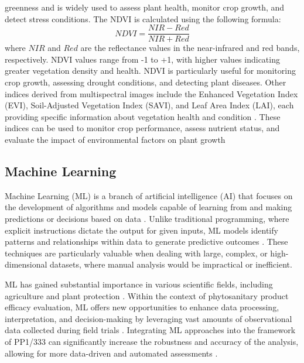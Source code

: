 \documentclass[12pt,a4paper,oneside]{report}
\begin{document}
greenness and is widely used to assess plant health, monitor crop growth, and
detect stress conditions. The NDVI is calculated using the following formula:
\[
NDVI = \frac{NIR - Red}{NIR + Red}
\]
where \(NIR\) and \(Red\) are the reflectance values in the near-infrared and red
bands, respectively. NDVI values range from -1 to +1, with higher values indicating
greater vegetation density and health. NDVI is particularly useful for monitoring
crop growth, assessing drought conditions, and detecting plant diseases.
Other indices derived from multispectral images include the Enhanced
Vegetation Index (EVI), Soil-Adjusted Vegetation Index (SAVI), and Leaf Area
Index (LAI), each providing specific information about vegetation health and
condition
\cite{hueteOverviewRadiometricBiophysical2002,qiModifiedSoilAdjusted1994}. 
These indices can be used to monitor crop performance, assess
nutrient status, and evaluate the impact of environmental factors on plant
growth
\cite{jonesRemoteSensingVegetation2010,mahleinHyperspectralSensorsImaging2018}

\subsection{Machine Learning}

Machine Learning (ML) is a branch of artificial intelligence (AI) that 
focuses on the development of algorithms and models capable of learning 
from and making predictions or decisions based on data \cite{kozaAutomatedDesignBoth1996}. 
Unlike traditional 
programming, where explicit instructions dictate the output for given inputs, 
ML models identify patterns and relationships within data to generate 
predictive outcomes \cite{hastieElementsStatisticalLearning2009}. 
These techniques are particularly valuable when 
dealing with large, complex, or high-dimensional datasets, where manual 
analysis would be impractical or inefficient.

ML has gained substantial importance in various scientific fields, including 
agriculture \cite{araujoMachineLearningApplications2023} and 
plant protection \cite{bockVisualEstimatesFully2020}. 
Within the context of phytosanitary product 
efficacy evaluation, ML offers new opportunities to enhance data processing, 
interpretation, and decision-making by leveraging vast amounts of observational 
data collected during field trials \cite{bockSpecialIssuePhytopathometry2022}. Integrating ML approaches into the framework 
of PP1/333 can significantly increase the robustness and accuracy of the analysis, 
allowing for more data-driven and automated assessments 
\cite{barbedoAutomaticMethodDetect2014,arnalbarbedoDigitalImageProcessing2013,bockPlantDiseaseSeverity2010}.
\end{document}
